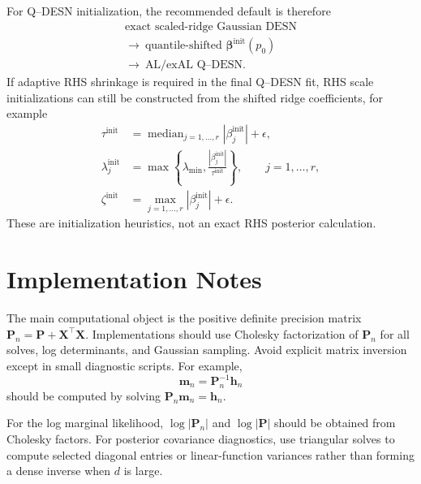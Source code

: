 \documentclass[11pt]{article}
\newcommand{\vect}[1]{\bm{#1}}
\newcommand{\mat}[1]{\bm{#1}}
\begin{document}
For Q--DESN initialization, the recommended default is therefore
\begin{equation}
\label{eq:init_pipeline}
\begin{gathered}
\text{exact scaled-ridge Gaussian DESN}\\
\longrightarrow\ \text{quantile-shifted }\vect\beta^{\mathrm{init}}(p_0)\\
\longrightarrow\ \text{AL/exAL Q--DESN}.
\end{gathered}
\end{equation}
If adaptive RHS shrinkage is required in the final Q--DESN fit, RHS scale
initializations can still be constructed from the shifted ridge coefficients,
for example
\begin{align}
\tau^{\mathrm{init}}
&=\operatorname{median}_{j=1,\ldots,r}|\beta_j^{\mathrm{init}}|+
\epsilon,
\label{eq:init_tau_rhs}\\
\lambda_j^{\mathrm{init}}
&=\max\left\{\lambda_{\min},
\frac{|\beta_j^{\mathrm{init}}|}{\tau^{\mathrm{init}}}\right\},
\qquad j=1,\ldots,r,
\label{eq:init_lambda_rhs}\\
\zeta^{\mathrm{init}}
&=\max_{j=1,\ldots,r}|\beta_j^{\mathrm{init}}|+
\epsilon.
\label{eq:init_zeta_rhs}
\end{align}
These are initialization heuristics, not an exact RHS posterior calculation.

\section{Implementation Notes}
\label{sec:implementation}

The main computational object is the positive definite precision matrix
\(\mat P_n=\mat P+\mat X^\top\mat X\). Implementations should use Cholesky
factorization of \(\mat P_n\) for all solves, log determinants, and Gaussian
sampling. Avoid explicit matrix inversion except in small diagnostic scripts.
For example,
\begin{equation}
\label{eq:solve_not_inverse}
\vect m_n=\mat P_n^{-1}\vect h_n
\end{equation}
should be computed by solving \(\mat P_n\vect m_n=\vect h_n\).

For the log marginal likelihood,
\(\log|\mat P_n|\) and \(\log|\mat P|\) should be obtained from Cholesky factors.
For posterior covariance diagnostics, use triangular solves to compute selected
diagonal entries or linear-function variances rather than forming a dense
inverse when \(d\) is large.
\end{document}
